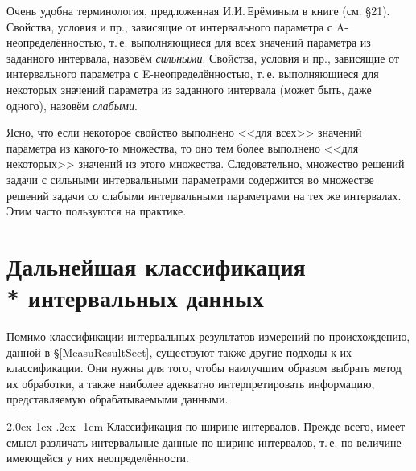 \documentclass[a5paper,openany]{book}
\makeatletter
\renewcommand\paragraph{\@startsection{paragraph}{4}{\z@}%
                         {2.0ex \@plus1ex \@minus.2ex}%
                         {-1em}%
                         {\normalfont\normalsize\bfseries}}
\makeatother
\begin{document}
Очень удобна терминология, предложенная И.И.\,Ерёминым в книге \cite{IIEremin} 
(см. \S 21). Свойства, условия и пр., зависящие от интервального параметра 
с A-неопределённостью, т.\,е. выполняющиеся для всех значений параметра из заданного 
интервала, назовём \emph{сильными}. Свойства, условия и пр., зависящие от интервального 
параметра с E-неопределённостью, т.\,е. выполняющиеся для некоторых значений параметра 
из заданного интервала (может быть, даже одного), назовём  \emph{слабыми}. 
   
Ясно, что если некоторое свойство выполнено <<для всех>> значений параметра 
из какого-то множества, то оно тем более выполнено <<для некоторых>> значений 
из этого множества. Следовательно, множество решений задачи с сильными интервальными 
параметрами содержится во множестве решений задачи со слабыми интервальными 
параметрами на тех же интервалах. Этим часто пользуются на практике. 
    
  
\section[Дальнейшая классификация интервальных данных]%
        {Дальнейшая классификация \\*  интервальных данных} 
\label{InteWidClass}
      
Помимо классификации интервальных результатов измерений по происхождению, данной 
в \S\ref{MeasuResultSect}, существуют также другие подходы к их классификации. 
Они нужны для того, чтобы наилучшим образом выбрать метод их обработки, а также 
наиболее адекватно интерпретировать информацию, представляемую обрабатываемыми 
данными. 
  
\paragraph{Классификация по ширине интервалов.}  
Прежде всего, имеет смысл различать интервальные данные по ширине интервалов, 
т.\,е. по величине имеющейся у них неопределённости. 
  
\end{document}

